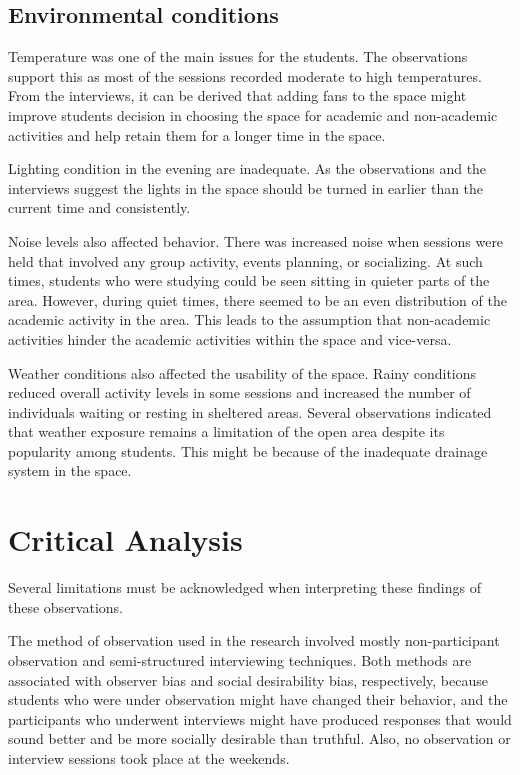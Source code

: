 \documentclass[12pt]{report}
\begin{document}
\section{Environmental conditions}
Temperature was one of the main issues for the students. The observations support this as most of the sessions recorded moderate to high temperatures. From the interviews, it can be derived that adding fans to the space might improve students decision 
in choosing the space for academic and non-academic activities and help retain them for a longer time in the space.

Lighting condition in the evening are inadequate. As the observations and the interviews suggest the lights in the space should be turned in earlier than the current time and consistently.

Noise levels also affected behavior. There was increased noise when sessions were held that involved any group activity, events planning, or socializing. At such times, students who were studying could be seen sitting in quieter parts of the area. 
However, during quiet times, there seemed to be an even distribution of the academic activity in the area. This leads to the assumption that non-academic activities hinder the academic activities within the space and vice-versa.

Weather conditions also affected the usability of the space. Rainy conditions reduced overall activity levels in some sessions and increased the number of individuals waiting or resting in sheltered areas. Several observations indicated that weather 
exposure remains a limitation of the open area despite its popularity among students. This might be because of the inadequate drainage system in the space.



\chapter{Critical Analysis}

Several limitations must be acknowledged when interpreting these findings of these observations.

The method of observation used in the research involved mostly non-participant observation and semi-structured interviewing techniques. Both methods are associated with observer bias and social desirability bias, respectively, because students who were under observation might have changed their behavior, and the participants who underwent interviews might have produced responses that would sound better and be more socially desirable than truthful.
Also, no observation or interview sessions took place at the weekends.
\end{document}
